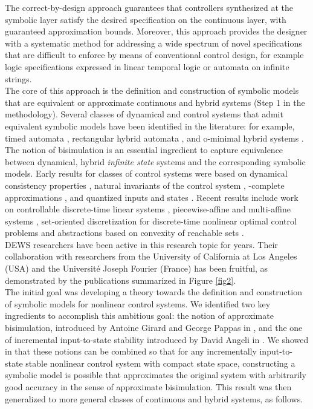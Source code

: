 \documentclass[submission,copyright,creativecommons]{eptcs}
\begin{document}
The correct-by-design approach guarantees that controllers synthesized at the symbolic layer satisfy the desired specification on the continuous layer, with guaranteed approximation bounds. Moreover, this approach provides the designer with a systematic method for addressing a wide spectrum of novel specifications that are difficult to enforce by means of conventional control design, for example logic specifications expressed in linear temporal logic or automata on infinite strings. \\

The core of this approach is the definition and construction of symbolic models that are equivalent or approximate continuous and hybrid systems (Step 1 in the methodology).
Several classes of dynamical and control systems that admit equivalent symbolic models have been identified in the literature: for example, timed automata \cite{alur}, rectangular hybrid automata \cite{puri}, and o-minimal hybrid systems \cite{lafferriere,brihaye}. The notion of bisimulation \cite{Milner,Park} is an essential ingredient to capture equivalence between dynamical, hybrid  \textit{infinite state} systems and the corresponding symbolic models. Early results for classes of control systems were based on dynamical consistency properties \cite{caines}, natural invariants of the control system \cite{koutsoukos}, -complete approximations \cite{moor}, and quantized inputs and states \cite{forstner,BMP02}. Recent results include work on controllable discrete-time linear systems \cite{TabuadaLTL}, piecewise-affine and multi-affine systems \cite{habets,BH06}, set-oriented discretization  for discrete-time nonlinear optimal control problems \cite{junge1} and abstractions based on convexity of reachable sets \cite{gunther}. \\
DEWS researchers have been active in this research topic for years. Their collaboration with researchers from the University of California at Los Angeles (USA) and the Universit\'e Joseph Fourier (France) has been fruitful, as demonstrated by the publications summarized in Figure \ref{fig2}. \\
The initial goal was developing a theory towards the definition and construction of symbolic models for nonlinear control systems. We identified two key ingredients to accomplish this ambitious goal: the notion of approximate bisimulation, introduced by Antoine Girard and George Pappas in \cite{AB-TAC07}, and the one of incremental input-to-state stability introduced by David Angeli in \cite{IncrementalS}. We showed in \cite{PolaAutom2008} that these notions can be combined so that for any incrementally input-to-state stable nonlinear control system with compact state space, constructing a symbolic model is possible that approximates the original system with arbitrarily good accuracy in the sense of approximate bisimulation. This result was then generalized to more general classes of continuous and hybrid systems, as follows. \\
\end{document}
